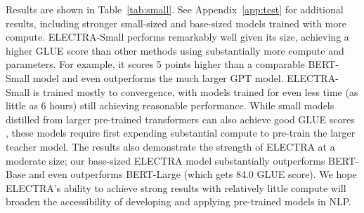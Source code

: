 \documentclass{article}
\begin{document}
Results are shown in Table~\ref{tab:small}. See Appendix~\ref{app:test} for additional results, including stronger small-sized and base-sized models trained with more compute. ELECTRA-Small performs remarkably well given its size, achieving a higher GLUE score than other methods using substantially more compute and parameters.
For example, it scores 5 points higher than a comparable BERT-Small model and even outperforms the much larger GPT model. 
ELECTRA-Small is trained mostly to convergence, with models trained for even less time (as little as 6 hours) still achieving reasonable performance.
While small models distilled from larger pre-trained transformers can also achieve good GLUE scores \citep{sunmobilebert,jiao2019tinybert}, these models require first expending substantial compute to pre-train the larger teacher model.
The results also demonstrate the strength of ELECTRA at a moderate size; our base-sized ELECTRA model substantially outperforms BERT-Base and even outperforms BERT-Large (which gets 84.0 GLUE score). 
We hope ELECTRA's ability to achieve strong results with relatively little compute will broaden the accessibility of developing and applying pre-trained models in NLP.
\end{document}
